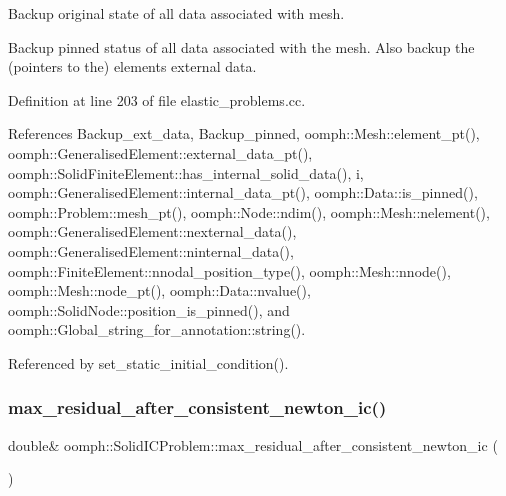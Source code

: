 Backup original state of all data associated with mesh. 

Backup pinned status of all data associated with the mesh. Also backup the (pointers to the) elements\textquotesingle{} external data. 

Definition at line 203 of file elastic\+\_\+problems.\+cc.



References Backup\+\_\+ext\+\_\+data, Backup\+\_\+pinned, oomph\+::\+Mesh\+::element\+\_\+pt(), oomph\+::\+Generalised\+Element\+::external\+\_\+data\+\_\+pt(), oomph\+::\+Solid\+Finite\+Element\+::has\+\_\+internal\+\_\+solid\+\_\+data(), i, oomph\+::\+Generalised\+Element\+::internal\+\_\+data\+\_\+pt(), oomph\+::\+Data\+::is\+\_\+pinned(), oomph\+::\+Problem\+::mesh\+\_\+pt(), oomph\+::\+Node\+::ndim(), oomph\+::\+Mesh\+::nelement(), oomph\+::\+Generalised\+Element\+::nexternal\+\_\+data(), oomph\+::\+Generalised\+Element\+::ninternal\+\_\+data(), oomph\+::\+Finite\+Element\+::nnodal\+\_\+position\+\_\+type(), oomph\+::\+Mesh\+::nnode(), oomph\+::\+Mesh\+::node\+\_\+pt(), oomph\+::\+Data\+::nvalue(), oomph\+::\+Solid\+Node\+::position\+\_\+is\+\_\+pinned(), and oomph\+::\+Global\+\_\+string\+\_\+for\+\_\+annotation\+::string().



Referenced by set\+\_\+static\+\_\+initial\+\_\+condition().

\mbox{\label{classoomph_1_1SolidICProblem_a350a8f545512d81ad6370f46cf0fafed}} 
\subsubsection{\texorpdfstring{max\+\_\+residual\+\_\+after\+\_\+consistent\+\_\+newton\+\_\+ic()}{max\_residual\_after\_consistent\_newton\_ic()}}
{\footnotesize\ttfamily double\& oomph\+::\+Solid\+I\+C\+Problem\+::max\+\_\+residual\+\_\+after\+\_\+consistent\+\_\+newton\+\_\+ic (\begin{DoxyParamCaption}{ }\end{DoxyParamCaption})\hspace{0.3cm}{\ttfamily [inline]}}



